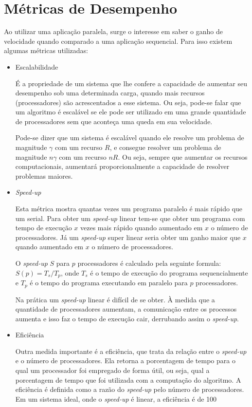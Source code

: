 \section{Métricas de Desempenho}\label{Metricas de desempenho}

Ao utilizar uma aplicação paralela, surge o interesse em saber o ganho de velocidade quando comparado a uma aplicação sequencial. Para isso existem algumas métricas utilizadas:

\begin{itemize}

\item Escalabilidade
	
	É a propriedade de um sistema que lhe confere a capacidade de aumentar seu desempenho sob uma determinada carga, quando mais recursos (processadores) são acrescentados a esse sistema. Ou seja, pode-se falar que um algoritmo é escalável se ele pode ser utilizado em uma grande quantidade de processadores sem que aconteça uma queda em sua velocidade.
	
	Pode-se dizer que um sistema é escalável quando ele resolve um problema de magnitude $\gamma$ com um recurso $R$, e consegue resolver um problema de magnitude $n\gamma$ com um recurso $nR$. Ou seja, sempre que aumentar os recursos computacionais, aumentará proporcionalmente a capacidade de resolver problemas maiores.
	
\item \textit{Speed-up}
	
	Esta métrica mostra quantas vezes um programa paralelo é mais rápido que um serial. Para obter um \textit{speed-up} linear tem-se que obter um programa com tempo de execução $x$ vezes mais rápido quando aumentado em $x$ o número de processadores. Já um \textit{speed-up} super linear seria obter um ganho maior que $x$ quando aumentado em $x$ o número de processadores.
	
	O \textit{speed-up} $S$ para $p$ processadores é calculado pela seguinte formula: $ S(p) = T_s / T_p $, onde $T_s$ é o tempo de execução do programa sequencialmente e $T_p$ é o tempo do programa executando em paralelo para $p$ processadores.
	
	Na prática um \textit{speed-up} linear é difícil de se obter. À medida que a quantidade de processadores aumentam, a comunicação entre os processos aumenta e isso faz o tempo de execução cair, derrubando assim o \textit{speed-up}.
	
\item Eficiência	
	
	Outra medida importante é a eficiência, que trata da relação entre o \textit{speed-up} e o número de processadores. Ela retorna a porcentagem de tempo para o qual um processador foi empregado de forma útil, ou seja, qual a porcentagem de tempo que foi utilizada com a computação do algoritmo. A eficiência é definida como a razão do \textit{speed-up} pelo número de processadores. Em um sistema ideal, onde o \textit{speed-up} é linear, a eficiência é de 100%
	
\end{itemize}

